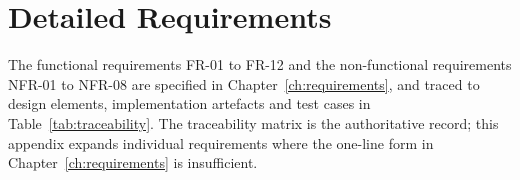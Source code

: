 \chapter{Detailed Requirements}
The functional requirements FR-01 to FR-12 and the non-functional requirements
NFR-01 to NFR-08 are specified in Chapter~\ref{ch:requirements}, and traced to design elements,
implementation artefacts and test cases in Table~\ref{tab:traceability}. The
traceability matrix is the authoritative record; this appendix expands individual
requirements where the one-line form in Chapter~\ref{ch:requirements} is insufficient.

